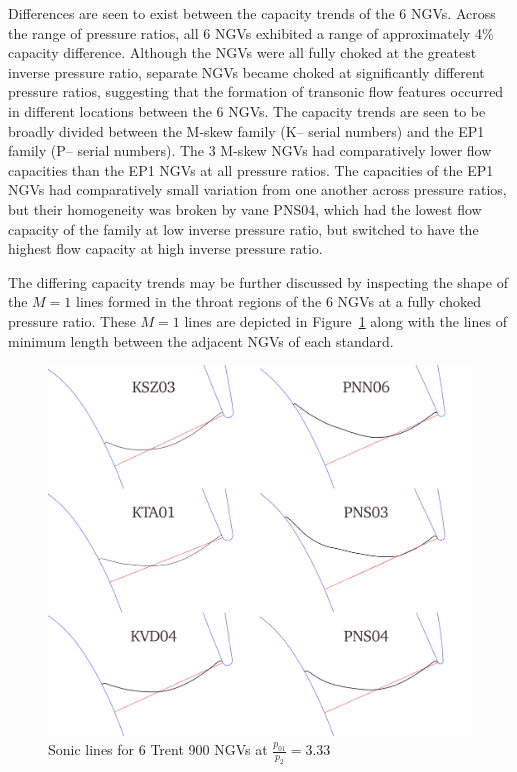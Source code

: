 \documentclass[a4paper, 11pt, oneside]{report}
\begin{document}
Differences are seen to exist between the capacity trends of the 6 NGVs. Across the range of pressure ratios, all 6 NGVs exhibited a range of approximately 4\% capacity difference. Although the NGVs were all fully choked at the greatest inverse pressure ratio, separate NGVs became choked at significantly different pressure ratios, suggesting that the formation of transonic flow features occurred in different locations between the 6 NGVs. The capacity trends are seen to be broadly divided between the M-skew family (K-- serial numbers) and the EP1 family (P-- serial numbers). The 3 M-skew NGVs had comparatively lower flow capacities than the EP1 NGVs at all pressure ratios. The capacities of the EP1 NGVs had comparatively small variation from one another across pressure ratios, but their homogeneity was broken by vane PNS04, which had the lowest flow capacity of the family at low inverse pressure ratio, but switched to have the highest flow capacity at high inverse pressure ratio.

The differing capacity trends may be further discussed by inspecting the shape of the $M=1$ lines formed in the throat regions of the 6 NGVs at a fully choked pressure ratio. These $M=1$ lines are depicted in Figure~\ref{fig:T900_mach1_lines} along with the lines of minimum length between the adjacent NGVs of each standard. 

\begin{figure}[H]
      \centering
      \includegraphics[width=.7\textwidth]{figs/T900_mach1_lines.png}
      \caption{Sonic lines for 6 Trent 900 NGVs at $\frac{p_{01}}{p_2}=3.33$}
      \label{fig:T900_mach1_lines}
\end{figure}
\end{document}
